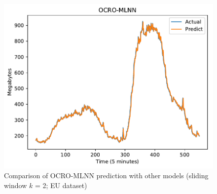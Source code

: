 \documentclass[smallcondensed, natbib]{svjour3}     %
\begin{document}
{\begin{figure}[!ht]
\begin{minipage}[b]{0.33\linewidth}
    \includegraphics[width=0.9\linewidth]{images/pdf/predict/k2/eu_k2_ocro_mlnn.pdf} 
  \end{minipage} 
  
  \caption{Comparison of OCRO-MLNN prediction with other models (sliding window $k$ = 2; EU dataset)} 
  \label{predict_eu_sliding2} 
\end{figure}

}
\end{document}
